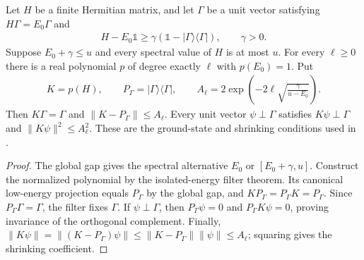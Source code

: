 \begin{theorem}
    \label{thm:chebyshev_ground_filter}
    \leanok
    Let $H$ be a finite Hermitian matrix, and let $\Gamma$ be a unit vector
    satisfying $H\Gamma=E_0\Gamma$ and
    \begin{align*}
        H-E_0\mathbb 1\ge\gamma(\mathbb 1-|\Gamma\rangle\langle\Gamma|),
        \qquad \gamma>0.
    \end{align*}
    Suppose $E_0+\gamma\le u$ and every spectral value of $H$ is at most $u$.
    For every $\ell\ge0$ there is a real polynomial $p$ of degree exactly $\ell$
    with $p(E_0)=1$. Put
    \begin{align*}
        K=p(H),\qquad P_\Gamma=|\Gamma\rangle\langle\Gamma|,\qquad
        A_\ell=2\exp\left(-2\ell\sqrt{\frac{\gamma}{u-E_0}}\right).
    \end{align*}
    Then $K\Gamma=\Gamma$ and $\|K-P_\Gamma\|\le A_\ell$.
    Every unit vector $\psi\perp\Gamma$ satisfies
    $K\psi\perp\Gamma$ and $\|K\psi\|^2\le A_\ell^2$.
    These are the ground-state and shrinking conditions used in
    \cite[Section~4, Lemma~4.1]{Arad2013AreaLaw}.
\end{theorem}
\begin{proof}
    \leanok
    The global gap gives the spectral alternative
    $E_0$ or $[E_0+\gamma,u]$.
    Construct the normalized polynomial by the isolated-energy filter theorem.
    Its canonical low-energy projection equals $P_\Gamma$ by the global gap,
    and $KP_\Gamma=P_\Gamma K=P_\Gamma$.
    Since $P_\Gamma\Gamma=\Gamma$, the filter fixes $\Gamma$.
    If $\psi\perp\Gamma$, then $P_\Gamma\psi=0$ and
    $P_\Gamma K\psi=0$, proving invariance of the orthogonal complement.
    Finally,
    $\|K\psi\|=\|(K-P_\Gamma)\psi\|\le\|K-P_\Gamma\|\|\psi\|\le A_\ell$;
    squaring gives the shrinking coefficient.
\end{proof}
